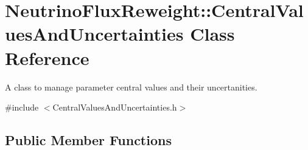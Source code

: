 \hypertarget{class_neutrino_flux_reweight_1_1_central_values_and_uncertainties}{\section{Neutrino\-Flux\-Reweight\-:\-:Central\-Values\-And\-Uncertainties Class Reference}
\label{class_neutrino_flux_reweight_1_1_central_values_and_uncertainties}
}


A class to manage parameter central values and their uncertanities.  




{\ttfamily \#include $<$Central\-Values\-And\-Uncertainties.\-h$>$}

\subsection*{Public Member Functions}
